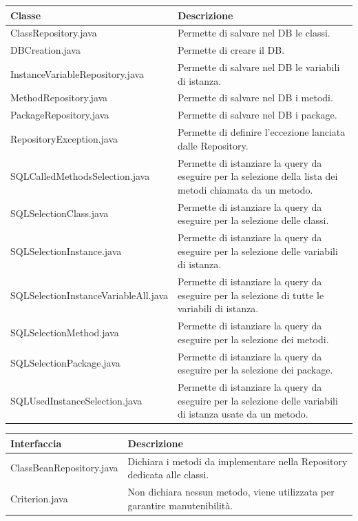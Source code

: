 \documentclass[11pt]{article}
\begin{document}
\begin{description}
\begin{tabular}{|p{}|p{}|}
					\hline
					\textbf{Classe} & \textbf{Descrizione}\\
					\hline
					ClassRepository.java & Permette di salvare nel DB le classi. \\
					\hline
					DBCreation.java & Permette di creare il DB. \\
					\hline
					InstanceVariableRepository.java & Permette di salvare nel DB le variabili di istanza.  \\
					\hline
					MethodRepository.java & Permette di salvare nel DB i metodi.  \\
					\hline
					PackageRepository.java & Permette di salvare nel DB i package. \\
					\hline
					RepositoryException.java & Permette di definire l'eccezione lanciata dalle Repository. \\
					\hline
					SQLCalledMethodsSelection.java & Permette di istanziare la query da eseguire per la selezione della lista dei metodi chiamata da un metodo. \\
					\hline
					SQLSelectionClass.java & Permette di istanziare la query da eseguire per la selezione delle classi. \\
					\hline
					SQLSelectionInstance.java & Permette di istanziare la query da eseguire per la selezione delle variabili di istanza. \\
					\hline
					SQLSelectionInstanceVariableAll.java & Permette di istanziare la query da eseguire per la selezione di tutte le variabili di istanza.\\
					\hline
					SQLSelectionMethod.java & Permette di istanziare la query da eseguire per la selezione dei metodi. \\
					\hline
					SQLSelectionPackage.java & Permette di istanziare la query da eseguire per la selezione dei package. \\
					\hline
					SQLUsedInstanceSelection.java & Permette di istanziare la query da eseguire per la selezione delle variabili di istanza usate da un metodo.	\\
					\hline
				\end{tabular}				
				\item \begin{tabular}{|p{}|p{}|}
					\hline
					\textbf{Interfaccia} & \textbf{Descrizione}\\
					\hline
					ClassBeanRepository.java & Dichiara i metodi da implementare nella Repository dedicata alle classi.\\
					\hline
					Criterion.java & Non dichiara nessun metodo, viene utilizzata per garantire manutenibilità. \\

\end{tabular}
\end{description}
\end{document}
